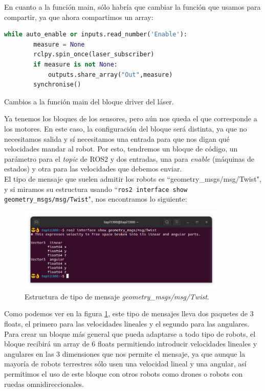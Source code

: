En cuanto a la función main, sólo habría que cambiar la función que usamos para compartir, ya que ahora compartimos un array:
\begin{code}[H]
  \begin{lstlisting}[language=python]
    while auto_enable or inputs.read_number('Enable'):
        measure = None
        rclpy.spin_once(laser_subscriber)
        if measure is not None:
            outputs.share_array("Out",measure)   
        synchronise()  
  \end{lstlisting}
  \caption[Cambios main bloque láser]{Cambios a la función main del bloque driver del láser.}
  \label{cod:laser_main_changes}
\end{code}

Ya tenemos los bloques de los sensores, pero aún nos queda el que corresponde a los motores.
En este caso, la configuración del bloque será distinta, ya que no necesitamos salida y sí necesitamos una entrada para que nos digan qué velocidades mandar al robot. Por esto, tendremos un bloque de código, un parámetro para el \textit{topic} de ROS2 y dos entradas, una para \textit{enable} (máquinas de estados) y otra para las velocidades que debemos enviar.\\

\newpage
El tipo de mensaje que suelen admitir los robots es ``geometry\_msgs/msg/Twist", y si miramos su estructura usando ``\lstinline|ros2 interface show geometry_msgs/msg/Twist|", nos encontramos lo siguiente:
\begin{figure} [H]
  \begin{center}
      \includegraphics[width=10cm]{figs/c4/twist_struct.png}
  \end{center}
  \caption[Estructura mensaje Twist]{Estructura de tipo de mensaje \textit{geometry\_msgs/msg/Twist}.}
  \label{fig:twist_struct}
\end{figure}

Como podemos ver en la figura \ref{fig:twist_struct}, este tipo de mensajes lleva dos paquetes de 3 floats, el primero para las velocidades lineales y el segundo para las angulares. Para crear un bloque más general que pueda adaptarse a todo tipo de robots, el bloque recibirá un array de 6 floats permitiendo introducir velocidades lineales y angulares en las 3 dimensiones que nos permite el mensaje, ya que aunque la mayoría de robots terrestres sólo usen una velocidad lineal y una angular, así permitimos el uso de este bloque con otros robots como drones o robots con ruedas omnidireccionales.\\

